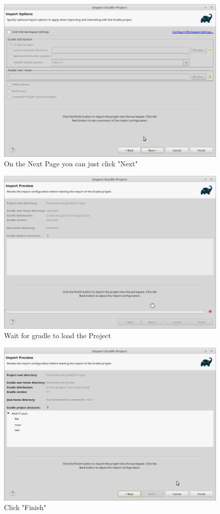 \begin{figure}[H]
	\includegraphics[width=\textwidth]{setup-parts/pictures/eclipse-import-5.png}
	\caption{On the Next Page you can just click "Next"}
\end{figure}
\begin{figure}[H]
	\includegraphics[width=\textwidth]{setup-parts/pictures/eclipse-import-6.png}
	\caption{Wait for gradle to load the Project}
\end{figure}
\begin{figure}[H]
	\includegraphics[width=\textwidth]{setup-parts/pictures/eclipse-import-7.png}
	\caption{Click "Finish"}
\end{figure}
